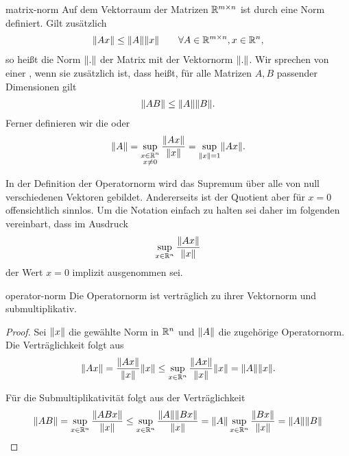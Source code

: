 \begin{Definition}{matrix-norm}
  Auf dem Vektorraum der Matrizen $\mathbb R^{m\times n}$ ist durch
   eine Norm definiert. Gilt zusätzlich
  \begin{gather}
    \lVert Ax\rVert \le \lVert A\rVert\lVert x\rVert
    \qquad\forall A\in \mathbb R^{m\times n}, x\in \mathbb R^n,
  \end{gather}
  so heißt die Norm $\lVert.\rVert$ der Matrix  mit der
  Vektornorm $\lVert.\rVert$. Wir sprechen von einer ,
  wenn sie zusätzlich  ist, dass heißt,
  für alle Matrizen $A,B$ passender Dimensionen gilt
  \begin{gather}
    \lVert AB\rVert \le \lVert A\rVert\lVert B\rVert.
  \end{gather}
  Ferner definieren wir die  oder 
  \begin{gather}
    \lVert A\rVert = \sup_{\substack{x\in\mathbb R^n\\x\neq0}} \frac{\lVert Ax\rVert}{\lVert x\rVert}
    = \sup_{\lVert x\rVert=1}\lVert Ax\rVert.
  \end{gather}
\end{Definition}

\begin{remark}
  In der Definition der Operatornorm wird das Supremum über alle von
  null verschiedenen Vektoren gebildet. Andererseits ist der Quotient
  aber für $x=0$ offensichtlich sinnlos. Um die Notation einfach zu halten sei daher im folgenden vereinbart, dass im Ausdruck
  \begin{gather}
    \sup_{x\in\mathbb R^n}\frac{\lVert Ax\rVert}{\lVert x\rVert}
  \end{gather}
  der Wert $x=0$ implizit ausgenommen sei.
\end{remark}

\begin{Lemma}{operator-norm}
  Die Operatornorm ist verträglich zu ihrer Vektornorm und submultiplikativ.
\end{Lemma}

\begin{proof}
  Sei $\lVert x\rVert$ die gewählte Norm in $\mathbb R^n$ und $\lVert A\rVert$ die
  zugehörige Operatornorm.  Die Verträglichkeit folgt aus
  \begin{gather}
    \lVert Ax\rVert = \frac{\lVert Ax\rVert}{\lVert x\rVert}\lVert x\rVert
    \le \sup_{x\in\mathbb R^n}\frac{\lVert Ax\rVert}{\lVert x\rVert}\lVert x\rVert
    = \lVert A\rVert\lVert x\rVert.
  \end{gather}

  Für die Submultiplikativität folgt aus der Verträglichkeit
  \begin{gather}
    \lVert AB\rVert = \sup_{x\in\mathbb R^n}\frac{\lVert ABx\rVert}{\lVert x\rVert}
    \le \sup_{x\in\mathbb R^n}\frac{\lVert A\rVert\lVert Bx\rVert}{\lVert x\rVert}
    = \lVert A\rVert\sup_{x\in\mathbb R^n}\frac{\lVert Bx\rVert}{\lVert x\rVert}
    = \lVert A\rVert\lVert B\rVert
  \end{gather}
\end{proof}

